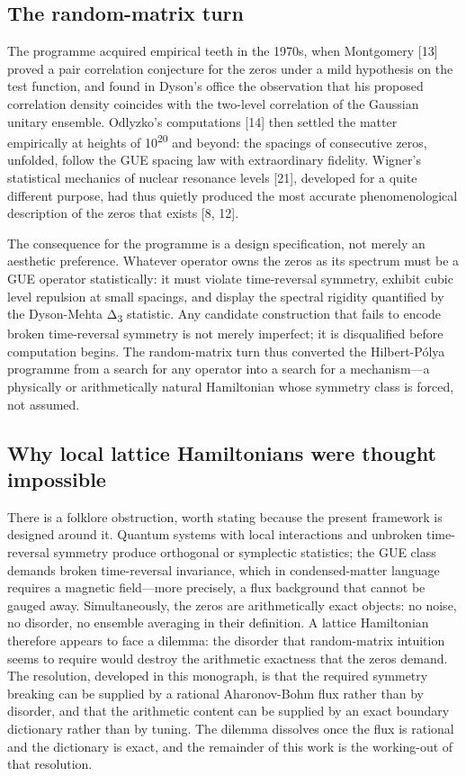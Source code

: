 \documentclass[10pt]{article}
\begin{document}
\subsection{The random-matrix turn}\label{sec:12}
The programme acquired empirical teeth in the 1970s, when Montgomery [13] proved a pair correlation conjecture for the zeros under a mild hypothesis on the test function, and found in Dyson's office the observation that his proposed correlation density coincides with the two-level correlation of the Gaussian unitary ensemble. Odlyzko's computations [14] then settled the matter empirically at heights of 10\textsuperscript{20} and beyond: the spacings of consecutive zeros, unfolded, follow the GUE spacing law with extraordinary fidelity. Wigner's statistical mechanics of nuclear resonance levels [21], developed for a quite different purpose, had thus quietly produced the most accurate phenomenological description of the zeros that exists [8, 12].

The consequence for the programme is a design specification, not merely an aesthetic preference. Whatever operator owns the zeros as its spectrum must be a GUE operator statistically: it must violate time-reversal symmetry, exhibit cubic level repulsion at small spacings, and display the spectral rigidity quantified by the Dyson-Mehta Δ\textsubscript{3} statistic. Any candidate construction that fails to encode broken time-reversal symmetry is not merely imperfect; it is disqualified before computation begins. The random-matrix turn thus converted the Hilbert-Pólya programme from a search for any operator into a search for a mechanism---a physically or arithmetically natural Hamiltonian whose symmetry class is forced, not assumed.

\subsection{Why local lattice Hamiltonians were thought impossible}\label{sec:13}
There is a folklore obstruction, worth stating because the present framework is designed around it. Quantum systems with local interactions and unbroken time-reversal symmetry produce orthogonal or symplectic statistics; the GUE class demands broken time-reversal invariance, which in condensed-matter language requires a magnetic field---more precisely, a flux background that cannot be gauged away. Simultaneously, the zeros are arithmetically exact objects: no noise, no disorder, no ensemble averaging in their definition. A lattice Hamiltonian therefore appears to face a dilemma: the disorder that random-matrix intuition seems to require would destroy the arithmetic exactness that the zeros demand. The resolution, developed in this monograph, is that the required symmetry breaking can be supplied by a rational Aharonov-Bohm flux rather than by disorder, and that the arithmetic content can be supplied by an exact boundary dictionary rather than by tuning. The dilemma dissolves once the flux is rational and the dictionary is exact, and the remainder of this work is the working-out of that resolution.
\end{document}

